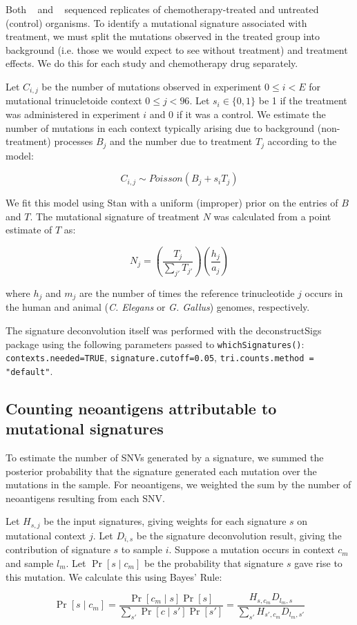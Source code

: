 Both ~\cite{Meier_2014} and ~\cite{Szikriszt_2016} sequenced replicates of chemotherapy-treated and untreated (control) organisms. To identify a mutational signature associated with treatment, we must split the mutations observed in the treated group into background (i.e. those we would expect to see without treatment) and treatment effects. We do this for each study and chemotherapy drug separately.

Let $C_{i,j}$ be the number of mutations observed in experiment $0 \leq i \lt E$ for mutational trinucletoide context $0 \leq j \lt 96$. Let $s_i \in \{0,1\}$ be 1 if the treatment was administered in experiment $i$ and 0 if it was a control. We estimate the number of mutations in each context typically arising due to background (non-treatment) processes $B_j$ and the number due to treatment $T_j$ according to the model:

\[
C_{i,j} \sim \mathit{Poisson}(B_j + s_i T_j)
\]

We fit this model using Stan\cite{Gelman_2015} with a uniform (improper) prior on the entries of $B$ and $T$. The mutational signature of treatment $N$ was calculated from a point estimate of $T$ as:

\[
N_j = \left ( \frac{T_j}{\sum_{j'}{T_{j'}}} \right ) \left ( \frac{h_j}{a_j} \right )
\]

where $h_j$ and $m_j$ are the number of times the reference trinucleotide $j$ occurs in the human and animal (\textit{C. Elegans} or \textit{G. Gallus}) genomes, respectively.

The signature deconvolution itself was performed with the deconstructSigs\cite{Rosenthal_2016} package using the following parameters passed to \texttt{whichSignatures()}: \texttt{contexts.needed=TRUE}, \texttt{signature.cutoff=0.05}, \texttt{tri.counts.method = "default"}.

\subsection*{Counting neoantigens attributable to mutational signatures}
To estimate the number of SNVs generated by a signature, we summed the posterior probability that the signature generated each mutation over the mutations in the sample. For neoantigens, we weighted the sum by the number of neoantigens resulting from each SNV.

Let $H_{s,j}$ be the input signatures, giving weights for each signature $s$ on mutational context $j$. Let $D_{i,s}$ be the signature deconvolution result, giving the contribution of signature $s$ to sample $i$. Suppose a mutation occurs in context $c_m$ and sample $l_m$. Let $\Pr[s \mid c_m]$ be the probability that signature $s$ gave rise to this mutation. We calculate this using Bayes' Rule:

\[

\Pr[s \mid c_m] = \frac{\Pr[c_m \mid s] \Pr[s]}{\sum_{s'}{\Pr[c \mid s']\Pr[s']}} = \frac{H_{s,c_m} D_{l_m,s}}{\sum_{s'}{H_{s',c_m} D_{l_m,s'}}}

\]
